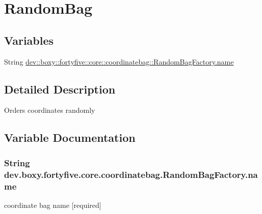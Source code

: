 \hypertarget{group___random_bag}{
\section{RandomBag}
\label{db/d7d/group___random_bag}
}
\subsection*{Variables}
\begin{DoxyCompactItemize}
\item 
String \hyperlink{group___random_bag_gad260363c7a952948df5381eb0bdb784a}{dev::boxy::fortyfive::core::coordinatebag::RandomBagFactory.name}
\end{DoxyCompactItemize}


\subsection{Detailed Description}
Orders coordinates randomly 

\subsection{Variable Documentation}
\hypertarget{group___random_bag_gad260363c7a952948df5381eb0bdb784a}{
\subsubsection[{name}]{\setlength{\rightskip}{0pt plus 5cm}String {\bf dev.boxy.fortyfive.core.coordinatebag.RandomBagFactory.name}}}
\label{db/d7d/group___random_bag_gad260363c7a952948df5381eb0bdb784a}
coordinate bag name \mbox{[}required\mbox{]} 